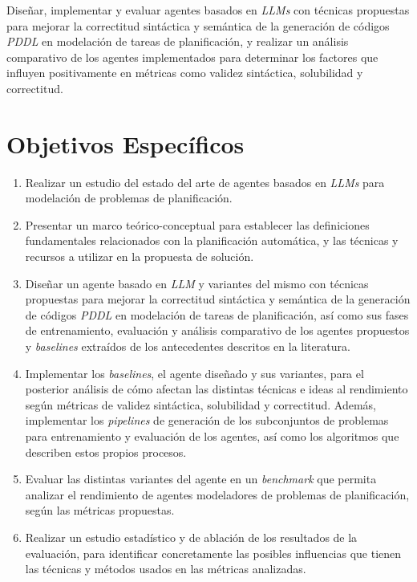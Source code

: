 Diseñar, implementar y evaluar agentes basados en \textit{LLMs} con técnicas propuestas para mejorar la correctitud sintáctica y semántica de la generación de códigos \textit{PDDL} en modelación de tareas de planificación, y realizar un análisis comparativo de los agentes implementados para determinar los factores que influyen positivamente en métricas como validez sintáctica, solubilidad y correctitud.

\section*{Objetivos Específicos}

\begin{enumerate}
	\item Realizar un estudio del estado del arte de agentes basados en \textit{LLMs} para modelación de problemas de planificación.

	\item Presentar un marco teórico-conceptual para establecer las definiciones fundamentales relacionados con la planificación automática, y las técnicas y recursos a utilizar en la propuesta de solución.

	\item Diseñar un agente basado en \textit{LLM} y variantes del mismo con técnicas propuestas para mejorar la correctitud sintáctica y semántica de la generación de códigos \textit{PDDL} en modelación de tareas de planificación, así como sus fases de entrenamiento, evaluación y análisis comparativo de los agentes propuestos y \textit{baselines} extraídos de los antecedentes descritos en la literatura. 

	\item Implementar los \textit{baselines}, el agente diseñado y sus variantes, para el posterior análisis de cómo afectan las distintas técnicas e ideas al rendimiento según métricas de validez sintáctica, solubilidad y correctitud. Además, implementar los \textit{pipelines} de generación de los subconjuntos de problemas para entrenamiento y evaluación de los agentes, así como los algoritmos que describen estos propios procesos.

	\item Evaluar las distintas variantes del agente en un \textit{benchmark} que permita analizar el rendimiento de agentes modeladores de problemas de planificación, según las métricas propuestas.

	\item Realizar un estudio estadístico y de ablación de los resultados de la evaluación, para identificar concretamente las posibles influencias que tienen las técnicas y métodos usados en las métricas analizadas.
	
\end{enumerate}


